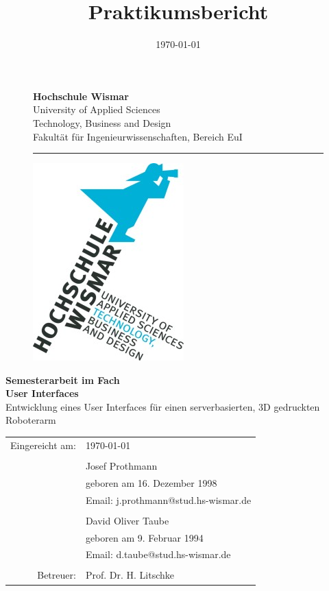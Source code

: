 \documentclass[12pt,					%
							 oneside,			%
							 a4paper,			%
							 halfparskip,		%
							 liststotoc,			%
							 bibtotoc,			%
							 fleqn,				%
							 pointlessnumbers]	%
							 {scrreprt}
\title{Praktikumsbericht}
\author{\Verfasserj \VerfasserD}
\date{\today{}}
\makeatletter
\newcommand{\VerfasserJ}{Josef Prothmann}
\newcommand{\EmailJ}{j.prothmann@stud.hs-wismar.de}
\newcommand{\GeburtstagJ}{16. Dezember 1998}
\newcommand{\VerfasserD}{David Oliver Taube}
\newcommand{\EmailD}{d.taube@stud.hs-wismar.de}
\newcommand{\GeburtstagD}{9. Februar 1994}
\newcommand{\Titel}{Entwicklung eines User Interfaces für einen serverbasierten, 3D gedruckten Roboterarm}
\newcommand{\Betreuer}{Prof. Dr. H. Litschke}
\makeatother
\begin{document}

	\renewcommand\lstlistingname{Code}
	\renewcommand\lstlistlistingname{Codeverzeichnis}
	
	\begin{titlepage}
		\setlength\headsep{-5mm}
		\begin{figure}[!h]
			\begin{minipage}{0.8\textwidth}
				\textbf{Hochschule Wismar} \\
				University of Applied Sciences \\
				Technology, Business and Design \\
				Fakultät für Ingenieurwissenschaften, Bereich EuI \\
			\rule{\textwidth}{0.5pt}
			\end{minipage}
			\begin{minipage}[r]{0.1\textwidth}
				\begin{flushright}
					\includegraphics[height=6\baselineskip]{pictures/HS-Wismar_Logo-FIW_2010-01.jpg}
				\end{flushright}
			\end{minipage}
		\end{figure}
		\vspace*{6cm}
		\begin{center}
			\Huge
			\textbf{Semesterarbeit im Fach\\ User Interfaces} \\
			\vspace{2cm}
			\large \Titel
			\begin{table}[b]
				\begin{tabular}{rl}
					
					Eingereicht am: &\today \\
					\\
					& \VerfasserJ \\ 
					& geboren am \GeburtstagJ \\ 
					& Email: \EmailJ \\
					\\
					& \VerfasserD\\ 
					& geboren am \GeburtstagD \\ 
					& Email: \EmailD \\
					\\
					Betreuer: & \Betreuer \\


\end{tabular}
\end{table}
\end{center}
\end{titlepage}
\end{document}
